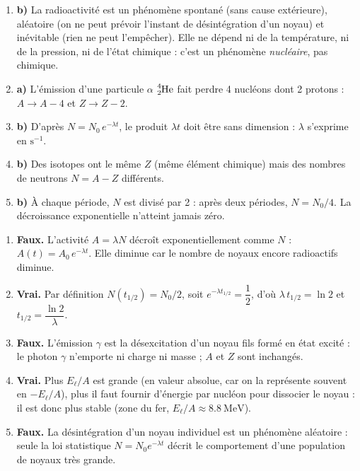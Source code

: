 \documentclass[11pt]{article}
\newcommand{\cle}[1]{{\popxbold\color{popdark}#1}}
\begin{document}
\begin{corrige}
\begin{enumerate}
\item \textbf{b)} La radioactivité est un phénomène \cle{spontané} (sans cause extérieure), \cle{aléatoire} (on ne peut prévoir l'instant de désintégration d'un noyau) et \cle{inévitable} (rien ne peut l'empêcher). Elle ne dépend ni de la température, ni de la pression, ni de l'état chimique : c'est un phénomène \emph{nucléaire}, pas chimique.
\item \textbf{a)} L'émission d'une particule $\alpha$ $\ce{^{4}_{2}He}$ fait perdre 4 nucléons dont 2 protons : $A \to A-4$ et $Z \to Z-2$.
\item \textbf{b)} D'après $N = N_0\,e^{-\lambda t}$, le produit $\lambda t$ doit être sans dimension : $\lambda$ s'exprime en $\mathrm{s^{-1}}$.
\item \textbf{b)} Des isotopes ont le même $Z$ (même élément chimique) mais des nombres de neutrons $N = A - Z$ différents.
\item \textbf{b)} À chaque période, $N$ est divisé par 2 : après deux périodes, $N = N_0/4$. La décroissance exponentielle n'atteint jamais zéro.
\end{enumerate}
\end{corrige}

\begin{corrige}
\begin{enumerate}
\item \textbf{Faux.} L'activité $A = \lambda N$ décroît exponentiellement comme $N$ : $A(t) = A_0\,e^{-\lambda t}$. Elle diminue car le nombre de noyaux encore radioactifs diminue.
\item \textbf{Vrai.} Par définition $N(t_{1/2}) = N_0/2$, soit $e^{-\lambda t_{1/2}} = \dfrac{1}{2}$, d'où $\lambda\, t_{1/2} = \ln 2$ et $t_{1/2} = \dfrac{\ln 2}{\lambda}$.
\item \textbf{Faux.} L'émission $\gamma$ est la désexcitation d'un noyau fils formé en état excité : le photon $\gamma$ n'emporte ni charge ni masse ; $A$ et $Z$ sont inchangés.
\item \textbf{Vrai.} Plus $E_\ell/A$ est grande (en valeur absolue, car on la représente souvent en $-E_\ell/A$), plus il faut fournir d'énergie par nucléon pour dissocier le noyau : il est donc plus stable (zone du fer, $E_\ell/A \approx \num{8,8}\ \mathrm{MeV}$).
\item \textbf{Faux.} La désintégration d'un noyau individuel est un phénomène \cle{aléatoire} : seule la loi statistique $N = N_0 e^{-\lambda t}$ décrit le comportement d'une population de noyaux très grande.
\end{enumerate}
\end{corrige}
\end{document}
